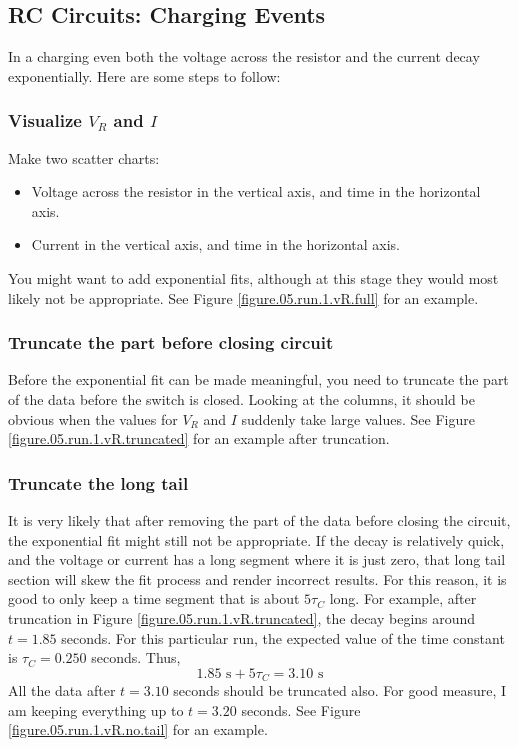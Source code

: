 \subsection{RC Circuits: Charging Events}
%
In a charging even both the voltage across the resistor and the current decay exponentially. Here are some steps to follow:
%
\subsubsection{Visualize $V_{R}$ and $I$}
%
Make two scatter charts:
\begin{itemize}
    \item Voltage across the resistor in the vertical axis, and time in the horizontal axis.
    \item Current in the vertical axis, and time in the horizontal axis.
\end{itemize}
You might want to add exponential fits, although at this stage they would most likely not be appropriate. See Figure \ref{figure.05.run.1.vR.full} for an example.
%
\subsubsection{Truncate the part before closing circuit}
%
Before the exponential fit can be made meaningful, you need to truncate the part of the data before the switch is closed. Looking at the columns, it should be obvious when the values for $V_{R}$ and $I$ suddenly take large values. See Figure \ref{figure.05.run.1.vR.truncated} for an example after truncation.
%
\subsubsection{Truncate the long tail}
%
It is very likely that after removing the part of the data before closing the circuit, the exponential fit might still not be appropriate. If the decay is relatively quick, and the voltage or current has a long segment where it is just zero, that long tail section will skew the fit process and render incorrect results. For this reason, it is good to only keep a time segment that is about $5\tau_{C}$ long. For example, after truncation in Figure \ref{figure.05.run.1.vR.truncated}, the decay begins around $t = 1.85$ seconds. For this particular run, the expected value of the time constant is $\tau_{C} = 0.250$ seconds. Thus,
\begin{equation}
    1.85 \text{ s} + 5 \tau_{C} = 3.10 \text{ s}
\end{equation}
All the data after $t = 3.10$ seconds should be truncated also. For good measure, I am keeping everything up to $t = 3.20$ seconds. See Figure \ref{figure.05.run.1.vR.no.tail} for an example.
%
